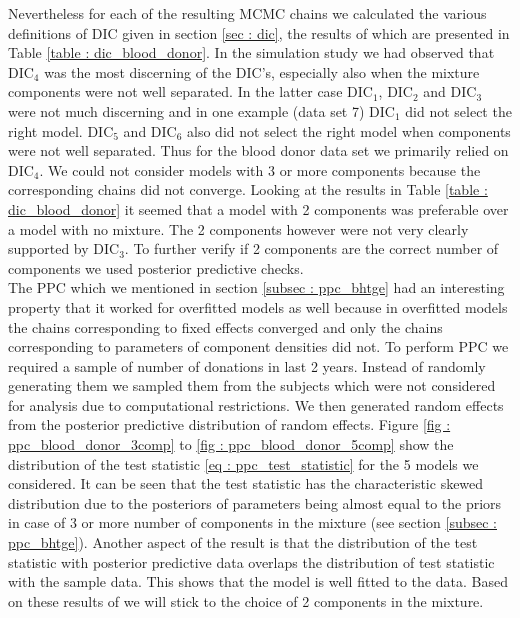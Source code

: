 Nevertheless for each of the resulting MCMC chains we calculated the various definitions of DIC given in section \ref{sec : dic}, the results of which are presented in Table \ref{table : dic_blood_donor}. In the simulation study we had observed that $\text{DIC}_4$ was the most discerning of the DIC's, especially also when the mixture components were not well separated. In the latter case $\text{DIC}_1$, $\text{DIC}_2$ and $\text{DIC}_3$ were not much discerning and in one example (data set 7) $\text{DIC}_1$ did not select the right model. $\text{DIC}_5$ and $\text{DIC}_6$ also did not select the right model when components were not well separated. Thus for the blood donor data set we primarily relied on $\text{DIC}_4$. We could not consider models with 3 or more components because the corresponding chains did not converge. Looking at the results in Table \ref{table : dic_blood_donor} it seemed that a model with 2 components was preferable over a model with no mixture. The 2 components however were not very clearly supported by $\text{DIC}_3$. To further verify if 2 components are the correct number of components we used posterior predictive checks.\\

The PPC which we mentioned in section \ref{subsec : ppc_bhtge} had an interesting property that it worked for overfitted models as well because in overfitted models the chains corresponding to fixed effects converged and only the chains corresponding to parameters of component densities did not. To perform PPC we required a sample of number of donations in last 2 years. Instead of randomly generating them we sampled them from the subjects which were not considered for analysis due to computational restrictions. We then generated random effects from the posterior predictive distribution of random effects. Figure \ref{fig : ppc_blood_donor_3comp} to \ref{fig : ppc_blood_donor_5comp} show the distribution of the test statistic \ref{eq : ppc_test_statistic} for the 5 models we considered. It can be seen that the test statistic has the characteristic skewed distribution due to the posteriors of parameters being almost equal to the priors in case of 3 or more number of components in the mixture (see section \ref{subsec : ppc_bhtge}). Another aspect of the result is that the distribution of the test statistic with posterior predictive data overlaps the distribution of test statistic with the sample data. This shows that the model is well fitted to the data. Based on these results of we will stick to the choice of 2 components in the mixture.\\

